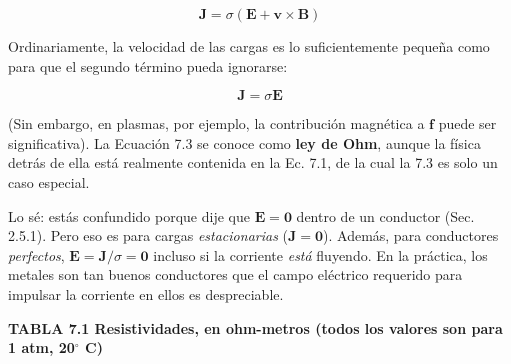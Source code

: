 \documentclass[12pt,a4paper]{report}
\newcommand{\esp}{\vspace{0.5cm}}
\begin{document}
	\esp
	
	\begin{equation}
		\mathbf{J} = \sigma (\mathbf{E} + \mathbf{v} \times \mathbf{B}) \tag{7.2}
	\end{equation}
	
	\esp
	
	Ordinariamente, la velocidad de las cargas es lo suficientemente pequeña como para que el segundo término pueda ignorarse:
	
	\esp
	
	\begin{equation}
		\mathbf{J} = \sigma \mathbf{E} \tag{7.3}
	\end{equation}
	
	\esp
	
	(Sin embargo, en plasmas, por ejemplo, la contribución magnética a $\mathbf{f}$ puede ser significativa). La Ecuación 7.3 se conoce como \textbf{ley de Ohm}, aunque la física detrás de ella está realmente contenida en la Ec. 7.1, de la cual la 7.3 es solo un caso especial.
	
	\esp
	
	Lo sé: estás confundido porque dije que $\mathbf{E} = \mathbf{0}$ dentro de un conductor (Sec. 2.5.1). Pero eso es para cargas \textit{estacionarias} ($\mathbf{J} = \mathbf{0}$). Además, para conductores \textit{perfectos}, $\mathbf{E} = \mathbf{J}/\sigma = \mathbf{0}$ incluso si la corriente \textit{está} fluyendo. En la práctica, los metales son tan buenos conductores que el campo eléctrico requerido para impulsar la corriente en ellos es despreciable.
	
	\esp
	
	\begin{center}
		\textbf{TABLA 7.1 Resistividades, en ohm-metros (todos los valores son para 1 atm, 20$^\circ$ C)}
	\end{center}
	
\end{document}
